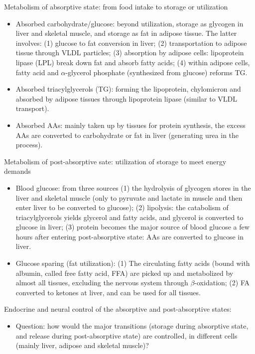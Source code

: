 \documentclass{report}
\begin{document}
\begin{enumerate}
Metabolism of absorptive state: from food intake to storage or utilization
\begin{itemize}
\item Absorbed carbohydrate/glucose: beyond utilization, storage as glycogen in liver and skeletal muscle, and storage as fat in adipose tissue. The latter involves: (1) glucose to fat conversion in liver; (2) transportation to adipose tissue through VLDL particles; (3) absorption by adipose cells: lipoprotein lipase (LPL) break down fat and absorb fatty acids; (4) within adipose cells, fatty acid and $\alpha$-glycerol phosphate (synthesized from glucose) reforms TG. 

\item Absorbed triacylglycerols (TG): forming the lipoprotein, chylomicron and absorbed by adipose tissues through lipoprotein lipase (similar to VLDL transport). 

\item Absorbed AAs: mainly taken up by tissues for protein synthesis, the excess AAs are converted to carbohydrate or fat in liver (generating urea in the process). 
\end{itemize}

Metabolism of post-absorptive sate: utilization of storage to meet energy demands
\begin{itemize}
\item Blood glucose: from three sources (1) the hydrolysis of glycogen stores in the liver and skeletal muscle (only to pyruvate and lactate in muscle and then enter liver to be converted to glucose); (2) lipolysis: the catabolism of triacylglycerols yields glycerol and fatty acids, and glycerol is converted to glucose in liver; (3) protein becomes the major source of blood glucose a few hours after entering post-absorptive state: AAs are converted to glucose in liver. 

\item Glucose sparing (fat utilization): (1) The circulating fatty acids (bound with albumin, called free fatty acid, FFA) are picked up and metabolized by almost all tissues, excluding the nervous system through $\beta$-oxidation; (2) FA converted to ketones at liver, and can be used for all tissues. 
\end{itemize}

Endocrine and neural control of the absorptive and post-absorptive states: 
\begin{itemize}
\item Question: how would the major transitions (storage during absorptive state, and release during post-absorptive state) are controlled, in different cells (mainly liver, adipose and skeletal muscle)? 


\end{itemize}
\end{enumerate}
\end{document}
